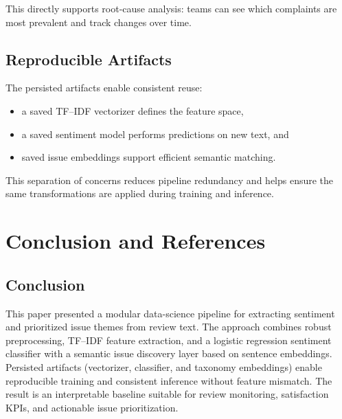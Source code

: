 \documentclass[12pt]{article}
\begin{document}
This directly supports root-cause analysis: teams can see which complaints are most prevalent and track changes over time.

\subsection{Reproducible Artifacts}
The persisted artifacts enable consistent reuse:
\begin{itemize}
  \item a saved TF--IDF vectorizer defines the feature space,
  \item a saved sentiment model performs predictions on new text, and
  \item saved issue embeddings support efficient semantic matching.
\end{itemize}

This separation of concerns reduces pipeline redundancy and helps ensure the same transformations are applied during training and inference.

\section{Conclusion and References}
\subsection{Conclusion}
This paper presented a modular data-science pipeline for extracting sentiment and prioritized issue themes from review text. The approach combines robust preprocessing, TF--IDF feature extraction, and a logistic regression sentiment classifier with a semantic issue discovery layer based on sentence embeddings. Persisted artifacts (vectorizer, classifier, and taxonomy embeddings) enable reproducible training and consistent inference without feature mismatch. The result is an interpretable baseline suitable for review monitoring, satisfaction KPIs, and actionable issue prioritization.
\end{document}
